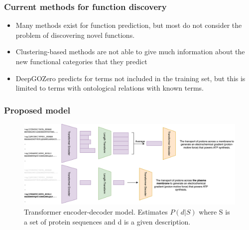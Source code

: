 \documentclass{beamer}
\begin{document}
\begin{frame}
\frametitle{Current methods for function discovery}
\begin{itemize}
    \item Many methods exist for function prediction, but most do not consider the problem of discovering novel functions.\pause
    \item Clustering-based methods are not able to give much information about the new functional categories that they predict\pause
    \item DeepGOZero  predicts for terms not included in the training set, but this is limited to terms with ontological relations with known terms.
\end{itemize}



\end{frame}

\begin{frame}
\frametitle{Proposed model}
\begin{figure}
    \centering
    \includegraphics[width=0.9\linewidth]{prot2go.png}
    \caption{Transformer encoder-decoder model. Estimates $P(d|S)$ where S is a set of protein sequences and d is a given description.}
    \label{overview}
\end{figure}

\end{frame}
\end{document}
